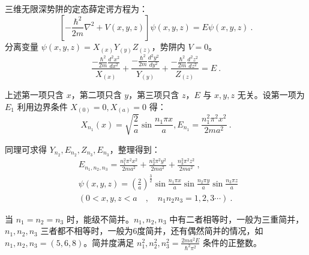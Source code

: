 \subsection{ }
三维无限深势阱的定态薛定谔方程为：\\
\begin{equation}
\left[ -\frac{\hbar^{2}}{2m} \nabla^{2} +V(x,y,z) \right]\psi(x,y,z) = E\psi(x,y,z)~.
\end{equation}
分离变量 $\psi(x,y,z) = X_(x)Y_(y)Z_(z) $，势阱内 $V=0$。\\
\begin{equation}
\frac{-\frac{\hbar^{2}}{2m}\frac{d^{2} {x}^{2}}{d{x^{2}}}}{X_(x)} + \frac{-\frac{\hbar^{2}}{2m}\frac{d^{2} {y}^{2}}{d{y^{2}}}}{Y_(y)} + \frac{-\frac{\hbar^{2}}{2m}\frac{d^{2} {z}^{2}}{d{z^{2}}}}{Z_(z)} = E~.
\end{equation}

上述第一项只含 $x$，第二项只含 $y$，第三项只含 $z$，$E$ 与 $x,y,z$ 无关。设第一项为 $E_1$ 利用边界条件 $X_{(0)} = 0,X_{(a)} = 0$ 得：\\
\begin{equation}
X_{n_1}(x) = \sqrt{\frac{2}{a}} \sin{\frac{n_{1} \pi x}{a}},E_{n_1} = \frac{n^2_1 \pi^2 x^2}{2ma^2}~.
\end{equation}

同理可求得 $Y_{n_2},E_{n_2},Z_{n_3},E_{n_3} $，整理得到：\\
\begin{equation}
\begin{aligned}
& E_{n_1,n_2,n_3} =\frac{n^2_1 \pi^2 x^2}{2ma^2}+\frac{n^2_2 \pi^2 y^2}{2ma^2}+\frac{n^2_3 \pi^2 z^2}{2ma^2} ~,\\
& \psi(x,y,z) = (\frac{2}{a})^{\frac{3}{2}} \sin{\frac{n_1 \pi x}{a}} \sin{\frac{n_2 \pi y}{a}} \sin{\frac{n_3 \pi z}{a}} ~\\
& (0<x,y,z<a \quad , \quad n_1 n_2 n_3 = 1,2,3 \cdots)~.
\end{aligned}
\end{equation}

当 $n_1 = n_2 = n_3$ 时，能级不简并。$n_1 , n_2 , n_3 $ 中有二者相等时，一般为三重简并，$n_1 , n_2 , n_3 $ 三者都不相等时，一般为6度简并，还有偶然简并的情况，如 $n_1 , n_2 , n_3 =(5,6,8) $。简并度满足 $\displaystyle n^2_1 , n^2_2 , n^2_3 = \frac{2ma^2 E}{\hbar^2 \pi^2}$ 条件的正整数。

